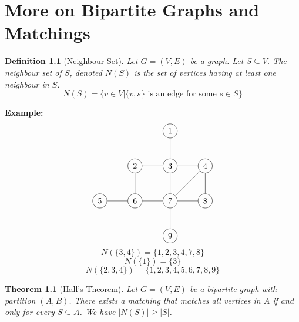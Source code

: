 \documentclass[openany]{report}
\newtheorem{theorem}{Theorem}[section]
\newtheorem{definition}{Definition}[section]
\begin{document}
\chapter{More on Bipartite Graphs and Matchings}
\begin{definition}[Neighbour Set]
    Let $G = (V,E)$ be a graph. Let $S \subseteq V$. The \emph{neighbour set} of $S$, denoted $N(S)$ is the set of vertices having at least one neighbour in $S$. 
    \[N(S) = \{v \in V | \{v, s\} \text{ is an edge for some $s \in S$}\}\]
\end{definition}
\noindent
\textbf{Example:}
\[
\begin{tikzpicture}[node distance={15mm}, main/.style ={draw, circle}]
    \node[main] (1) {1};
    \node[main] (2) [below of=1]{3};
    \node[main] (3) [left of=2]{2};
    \node[main] (4) [right of=2]{4};
    \node[main] (5) [below of=2]{7};
    \node[main] (6) [left of=5]{6};
    \node[main] (7) [right of=5]{8};
    \node[main] (8) [below of=5]{9};
    \node[main] (9) [left of=6] {5};
    \draw (1)--(2);
    \draw (2)--(3);
    \draw (2)--(4);
    \draw (2)--(5);
    \draw (5)--(6);
    \draw (5)--(7);
    \draw (5)--(8);
    \draw (6)--(9);
    \draw (4)--(5);
    \draw (4)--(7);
    \draw (3)--(6);
\end{tikzpicture}
\] 
\[N(\{3,4\}) = \{1,2,3,4,7,8\}\]
\[N(\{1\}) = \{3\}\]
\[N(\{2,3,4\}) = \{1,2,3,4,5,6,7,8,9\}\]
\begin{theorem}[Hall's Theorem]
    Let $G = (V,E)$ be a bipartite graph with partition $(A,B)$. There exists a matching that matches all vertices in $A$ if and only for every $S \subseteq A$. We have $|N(S)| \geq |S|$.
\end{theorem}
\end{document}
